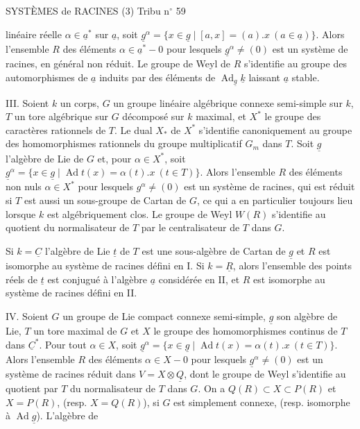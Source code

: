 SYSTÈMES de RACINES (3) \hfill Tribu n$^\circ$ 59

linéaire réelle $\alpha\in\underline{a}^*$ sur $\underline{a}$, soit
$\underline{g}^\alpha=\{x\in\underline{g}\mid[a,x]=(a).x\ (a\in\underline{a})\}$.
Alors l'ensemble $R$ des éléments $\alpha\in\underline{a}^*-0$ pour lesquels
$\underline{g}^\alpha\ne(0)$ est un système de racines, en général non réduit.
Le groupe de Weyl de $R$ s'identifie au groupe des automorphismes de $\underline{a}$ induits par des éléments de $\operatorname{Ad}_{\underline{g}}\underline{k}$ laissant $\underline{a}$ stable.

III. Soient $k$ un corps, $G$ un groupe linéaire algébrique connexe semi-simple sur $k$, $T$ un tore algébrique sur $G$ décomposé sur $k$ maximal, et $X^*$ le groupe des caractères rationnels de $T$.
Le dual $X_*$ de $X^*$ s'identifie canoniquement au groupe des homomorphismes rationnels du groupe multiplicatif $G_m$ dans $T$.
Soit $\underline{g}$ l'algèbre de Lie de $G$ et, pour $\alpha\in X^*$, soit
$\underline{g}^\alpha=\{x\in\underline{g}\mid\operatorname{Ad}t(x)=\alpha(t).x\ (t\in T)\}$.
Alors l'ensemble $R$ des éléments non nuls $\alpha\in X^*$ pour lesquels $g^\alpha\ne(0)$ est un système de racines, qui est réduit si $T$ est aussi un sous-groupe de Cartan de $G$, ce qui a en particulier toujours lieu lorsque $k$ est algébriquement clos.
Le groupe de Weyl $W(R)$ s'identifie au quotient du normalisateur de $T$ par le centralisateur de $T$ dans $G$.

Si $k=\underline{C}$ l'algèbre de Lie $\underline{t}$ de $T$ est une sous-algèbre de Cartan de $\underline{g}$ et $R$ est isomorphe au système de racines défini en I.
Si $k=\underline{R}$, alors l'ensemble des points réels de $\underline{t}$ est conjugué à l'algèbre $\underline{a}$ considérée en II, et $R$ est isomorphe au système de racines défini en II.

IV. Soient $G$ un groupe de Lie compact connexe semi-simple, $\underline{g}$ son algèbre de Lie, $T$ un tore maximal de $G$ et $X$ le groupe des homomorphismes continus de $T$ dans $\underline{C}^*$.
Pour tout $\alpha\in X$, soit $\underline{g}^\alpha=\{x\in\underline{g}\mid\operatorname{Ad}t(x)=\alpha(t).x\ (t\in T)\}$.
Alors l'ensemble $R$ des éléments $\alpha\in X-0$ pour lesquels $\underline{g}^\alpha\ne(0)$ est un système de racines réduit dans $V=X\otimes\underline{Q}$, dont le groupe de Weyl s'identifie au quotient par $T$ du normalisateur de $T$ dans $G$.
On a $Q(R)\subset X\subset P(R)$ et $X=P(R)$, (resp. $X=Q(R)$), si $G$ est simplement connexe, (resp. isomorphe à $\operatorname{Ad}\underline{g}$). L'algèbre de

